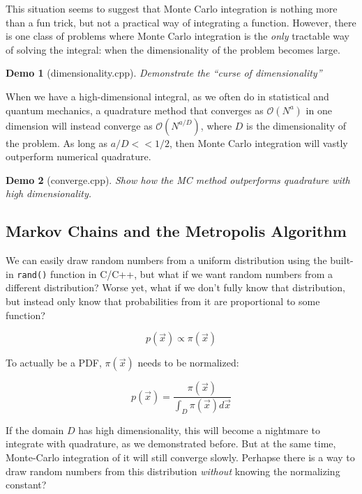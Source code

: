 \documentclass{article}
\theoremstyle{demo}
\newtheorem{demo}{Demo}[section]
\begin{document}
This situation seems to suggest that Monte Carlo integration is nothing more
than a fun trick, but not a practical way of integrating a function.  However,
there is one class of problems where Monte Carlo integration is the
\textit{only} tractable way of solving the integral:  when the dimensionality of
the problem becomes large.  

\begin{demo}[dimensionality.cpp]
    Demonstrate the ``curse of dimensionality''
\end{demo}

When we have a high-dimensional integral, as we often do in statistical and
quantum mechanics, a quadrature method that converges as $\mathcal{O}(N^a)$ in
one dimension will instead converge as $\mathcal{O}(N^{a/D})$, where $D$ is the
dimensionality of the problem.  As long as $a/D<<1/2$, then Monte Carlo
integration will vastly outperform numerical quadrature.

\begin{demo}[converge.cpp]
    Show how the MC method outperforms quadrature with high dimensionality.
\end{demo}

\subsection{Markov Chains and the Metropolis Algorithm}
We can easily draw random numbers from a uniform distribution using the built-in
\texttt{rand()} function in C/C++, but what if we want random numbers from a
different distribution?  Worse yet, what if we don't fully know that
distribution, but instead only know that probabilities from it are proportional
to some function?

\begin{equation}
    p(\vec x) \propto \pi(\vec x)
\end{equation}

To actually be a PDF, $\pi(\vec x)$ needs to be normalized:

\begin{equation}
    p(\vec x) = \frac{\pi(\vec x)}{\int_D \pi(\vec x) d\vec x}
\end{equation}

If the domain $D$ has high dimensionality, this will become a nightmare to
integrate with quadrature, as we demonstrated before.  But at the same time,
Monte-Carlo integration of it will still converge slowly.  Perhapse there is a
way to draw random numbers from this distribution \textit{without} knowing the
normalizing constant?
\end{document}
